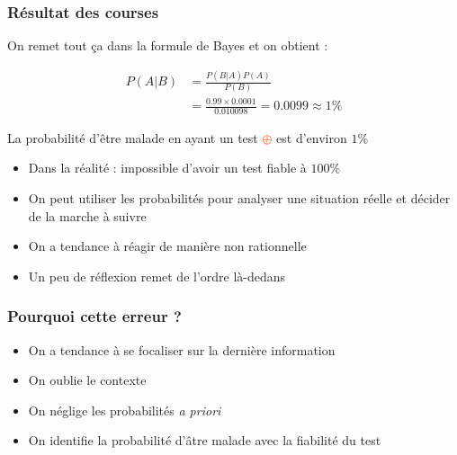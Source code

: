 \documentclass[usenames, dvipsnames]{beamer}
\newcommand{\positif}{\textcolor{OrangeRed}{$\oplus$} }
\begin{document}
\begin{frame}[plain]
\frametitle{Résultat des courses}

On remet tout ça dans la formule de Bayes et on obtient :

\begin{align*}
P(A|B) &= \frac{P(B|A)P(A)}{P(B)}\\
&= \frac{0.99 \times 0.0001}{0.010098} = 0.0099 \approx 1\%
\end{align*}


\pause
La probabilité d'être malade en ayant un test \positif est d'environ $1\%$

\pause

\begin{itemize}
\item Dans la réalité : impossible d'avoir un test fiable à $100\%$ \pause
\item On peut utiliser les probabilités pour analyser une situation réelle et décider de la marche à suivre \pause
\item On a tendance à réagir de manière non rationnelle\pause
\item Un peu de réflexion remet de l'ordre là-dedans%
\end{itemize}


\end{frame}


\begin{frame}[plain]
\frametitle{Pourquoi cette erreur ?}






\vspace{2cm}

\begin{itemize}
\item<2-> On a tendance à se focaliser sur la dernière information
\item<3-> On oublie le contexte
\item<4-> On néglige les probabilités \textit{a priori}
\item<5-> On identifie la probabilité d'âtre malade avec la fiabilité du test
\end{itemize}


\end{frame}
\end{document}
